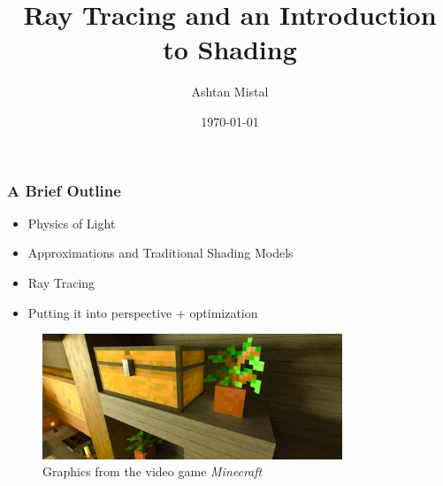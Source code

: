 \documentclass[12pt]{beamer}
\title{Ray Tracing and an Introduction to Shading}
\author{Ashtan Mistal}
\date{\today}
\begin{document}
  \begin{frame}
    \titlepage
  \end{frame}

  \begin{frame}
    \frametitle{A Brief Outline}
    \begin{itemize}
      \item Physics of Light
      \item Approximations and Traditional Shading Models
      \item Ray Tracing
      \item Putting it into perspective + optimization
    \end{itemize}
  \end{frame}

  \begin{frame}

    \begin{figure}
      \centering
      \includegraphics[width=0.8\textwidth]{minecraft.jpg}
      \caption{Graphics from the video game \textit{Minecraft}}\label{fig:minecraft}
    \end{figure}
  \end{frame}
\end{document}
